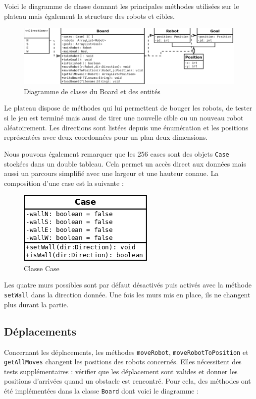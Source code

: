 \documentclass[a4paper]{article} %
\begin{document}
Voici le diagramme de classe donnant les principales méthodes utilisées sur le plateau mais également la structure des robots et cibles.
\pagebreak
\begin{figure}[!h]
	\begin{center}
	\includegraphics[scale=0.5]{./images/boardwithentities.png}
	\caption{Diagramme de classe du Board et des entités}
	\end{center}
\end{figure}

Le plateau dispose de méthodes qui lui permettent de bouger les robots, de tester si le jeu est terminé mais aussi de tirer une nouvelle cible ou un nouveau robot aléatoirement. Les directions sont listées depuis une énumération et les positions représentées avec deux coordonnées pour un plan deux dimensions.

Nous pouvons également remarquer que les 256 cases sont des objets \texttt{Case} stockées dans un double tableau. Cela permet un accès direct aux données mais aussi un parcours simplifié avec une largeur et une hauteur connue. La composition d'une case est la suivante :
\begin{figure}[htpb]
	\begin{center}
	\includegraphics[scale=0.5]{./images/casediag.png}
	\caption{Classe Case}
	\end{center}
\end{figure}

Les quatre murs possibles sont par défaut désactivés puis activés avec la méthode \texttt{setWall} dans la direction donnée. Une fois les murs mis en place, ils ne changent plus durant la partie.

	\subsection{Déplacements}
Concernant les déplacements, les méthodes \texttt{moveRobot}, \texttt{moveRobotToPosition} et \texttt{getAllMoves} changent les positions des robots concernés. Elles nécessitent des tests supplémentaires : vérifier que les déplacement sont valides et donner les positions d'arrivées quand un obstacle est rencontré. Pour cela, des méthodes ont été implémentées dans la classe \texttt{Board} dont voici le diagramme :
\end{document}
